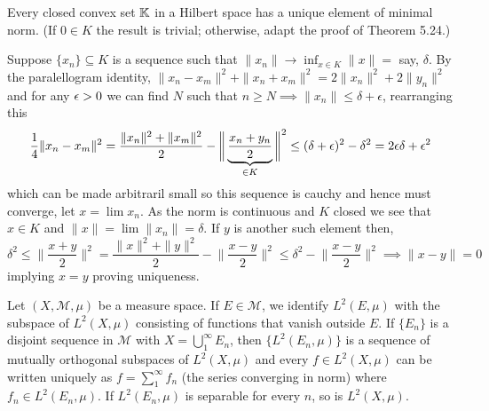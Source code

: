 \documentclass[12pt,a4paper]{article}
\begin{document}
\begin{problem}\label{prob:5-59}
Every closed convex set $\mathbb{K}$ in a Hilbert space has a unique element of minimal norm. (If $0 \in K$ the result is trivial; otherwise, adapt the proof of Theorem 5.24.)
\end{problem}
\begin{solution}
    Suppose $\{x_n\} \subseteq K$ is a sequence such that $\|x_n\|\to\inf_{x\in K}\|x\|=$ say, $\delta.$  
    By the paralellogram identity, $\|x_n-x_m\|^2+\|x_n+x_m\|^2=2\|x_n\|^2+2\|y_n\|^2$ and for any $\epsilon>0$ we can find $N$ such that $n\geq N\implies\|x_n\|\leq\delta+\epsilon$, rearranging this 
    \[
        \frac{1}{4}\|x_n-x_m\|^2=\frac{\|x_n\|^2+\|x_m\|^2}{2}- \bigg\|\underbrace{\frac{x_n+y_n}{2}}_{\in K}\bigg\|^2\leq(\delta+\epsilon)^2-\delta^2=2\epsilon\delta+\epsilon^2
    \]
    which can be made arbitraril small so this sequence is cauchy and hence must converge, let $x=\lim x_n.$ 
    As the norm is continuous and $K$ closed we see that $x\in K$ and $\|x\|=\lim\|x_n\|=\delta$. 
    If $y$ is another such element then, 
    \[
        \delta^2\leq\bigg\|\frac{x+y}{2}\bigg\|^2= \frac{\|x\|^2+\|y\|^2}{2}-\bigg\| \frac{x-y}{2}\bigg\|^2\leq\delta^2-\bigg\| \frac{x-y}{2}\bigg\|^2\implies \|x-y\|=0
    \]
    implying $x=y$ proving uniqueness.
\end{solution}
\begin{problem}\label{prob:5-60}
Let $(X,\mathcal{M},\mu)$ be a measure space. If $E \in \mathcal{M}$, we identify $L^2(E,\mu)$ with the subspace of $L^2(X,\mu)$ consisting of functions that vanish outside $E$. If $\{E_n\}$ is a disjoint sequence in $\mathcal{M}$ with $X = \bigcup_{1}^{\infty} E_n$, then $\{L^2(E_n,\mu)\}$ is a sequence of mutually orthogonal subspaces of $L^2(X,\mu)$ and every $f \in L^2(X,\mu)$ can be written uniquely as $f = \sum_{1}^{\infty} f_n$ (the series converging in norm) where $f_n \in L^2(E_n,\mu)$. If $L^2(E_n,\mu)$ is separable for every $n$, so is $L^2(X,\mu)$.
\end{problem}
\end{document}
